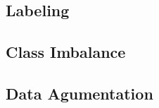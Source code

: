 \subsection{Labeling}











\subsection{Class Imbalance}

















\subsection{Data Agumentation}















